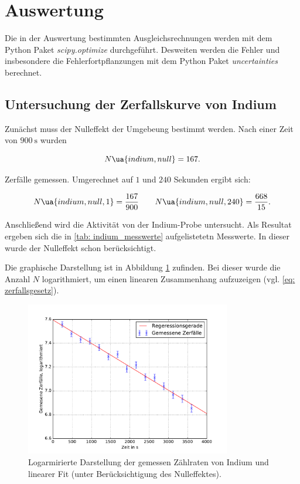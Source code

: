 \section{Auswertung}

Die in der Auswertung bestimmten Ausgleichsrechnungen werden mit
dem Python Paket \emph{scipy.optimize}\cite{scipy} durchgeführt.
Desweiten werden die Fehler und insbesondere die Fehlerfortpflanzungen
mit dem Python Paket \emph{uncertainties}\cite{uncertainties} berechnet.

\subsection{Untersuchung der Zerfallskurve von Indium}
Zunächst muss der Nulleffekt der Umgebeung bestimmt werden.
Nach einer Zeit von $\SI{900}{\second}$ wurden

\begin{equation*}
  N\ua{indium,null}=167.
\end{equation*}

Zerfälle gemessen. Umgerechnet auf $1$ und $240$ Sekunden ergibt sich:

\begin{equation}
  \label{eq:nulleffekt_indium}
  N\ua{indium,null,1}=\frac{167}{900} \qquad N\ua{indium,null,240}=\frac{668}{15}.
\end{equation}

Anschließend wird die Aktivität von der Indium-Probe untersucht.
Als Resultat ergeben sich die in \ref{tab: indium_messwerte} aufgelistetetn Messwerte.
In dieser wurde der Nulleffekt schon berücksichtigt.


Die graphische Darstellung ist in Abbildung \ref{fig: plot_indium} zufinden. Bei dieser wurde
die Anzahl $N$ logarithmiert, um einen linearen Zusammenhang aufzuzeigen (vgl. \eqref{eq: zerfallsgesetz}).
\begin{figure}
  \centering
  \includegraphics[width=0.8\textwidth]{pics/logarithmiert_indium.pdf}
  \caption{Logarmirierte Darstellung der gemessen Zählraten von Indium und linearer Fit  (unter Berücksichtigung des Nulleffektes).}
  \label{fig: plot_indium}
\end{figure}

